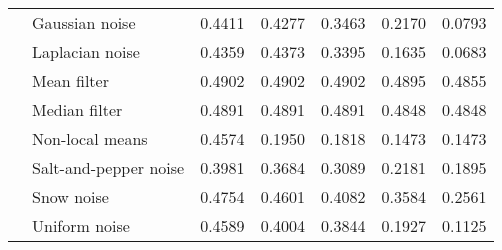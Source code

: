 \begin{tabular}{llrrrrr}
  & Gaussian noise &  0.4411 &  0.4277 &  0.3463 &  0.2170 &  0.0793 \\
  & Laplacian noise &  0.4359 &  0.4373 &  0.3395 &  0.1635 &  0.0683 \\
  & Mean filter &  0.4902 &  0.4902 &  0.4902 &  0.4895 &  0.4855 \\
  & Median filter &  0.4891 &  0.4891 &  0.4891 &  0.4848 &  0.4848 \\
  & Non-local means &  0.4574 &  0.1950 &  0.1818 &  0.1473 &  0.1473 \\
  & Salt-and-pepper noise &  0.3981 &  0.3684 &  0.3089 &  0.2181 &  0.1895 \\
  & Snow noise &  0.4754 &  0.4601 &  0.4082 &  0.3584 &  0.2561 \\
  & Uniform noise &  0.4589 &  0.4004 &  0.3844 &  0.1927 &  0.1125 \\
\bottomrule
\end{tabular}
